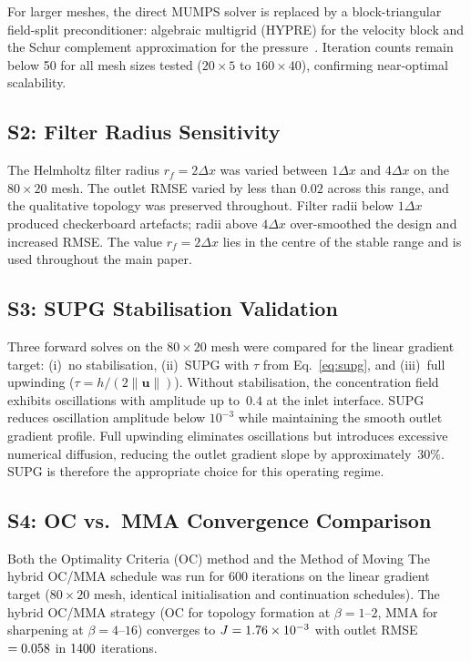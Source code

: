For larger meshes, the direct MUMPS solver is replaced by a
block-triangular field-split preconditioner: algebraic multigrid (HYPRE)
for the velocity block and the Schur complement approximation for the
pressure~\cite{elman2014}.
Iteration counts remain below 50 for all mesh sizes tested
($20\times5$ to $160\times40$), confirming near-optimal scalability.

\subsection*{S2: Filter Radius Sensitivity}
\label{sec:s2}

The Helmholtz filter radius $r_f = 2\Delta x$ was varied between
$1\Delta x$ and $4\Delta x$ on the $80\times20$ mesh.
The outlet RMSE varied by less than $0.02$ across this range, and
the qualitative topology was preserved throughout.
Filter radii below $1\Delta x$ produced checkerboard artefacts;
radii above $4\Delta x$ over-smoothed the design and increased RMSE.
The value $r_f = 2\Delta x$ lies in the centre of the stable range
and is used throughout the main paper.

\subsection*{S3: SUPG Stabilisation Validation}
\label{sec:s3}

Three forward solves on the $80\times20$ mesh were compared for the
linear gradient target:
(i)~no stabilisation, (ii)~SUPG with $\tau$ from Eq.~\eqref{eq:supg},
and (iii)~full upwinding ($\tau = h/(2\|\mathbf{u}\|)$).
Without stabilisation, the concentration field exhibits oscillations with
amplitude up to~$0.4$ at the inlet interface.
SUPG reduces oscillation amplitude below $10^{-3}$ while maintaining
the smooth outlet gradient profile.
Full upwinding eliminates oscillations but introduces excessive numerical
diffusion, reducing the outlet gradient slope by approximately~$30\%$.
SUPG is therefore the appropriate choice for this operating regime.

\subsection*{S4: OC vs.\ MMA Convergence Comparison}
\label{sec:s4}

Both the Optimality Criteria (OC) method and the Method of Moving
The hybrid OC/MMA schedule was run for 600 iterations on the
linear gradient target ($80\times20$ mesh, identical initialisation and
continuation schedules).
The hybrid OC/MMA strategy (OC for topology formation at $\beta=1$--$2$,
MMA for sharpening at $\beta=4$--$16$) converges to
$J = 1.76\times10^{-3}$ with outlet RMSE~$=0.058$ in $1400$ iterations.

